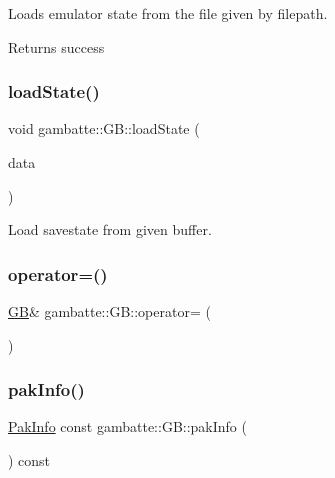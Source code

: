 Loads emulator state from the file given by \textquotesingle{}filepath\textquotesingle{}. \begin{DoxyReturn}{Returns}
success 
\end{DoxyReturn}
\mbox{\label{classgambatte_1_1GB_a8745c11c1ab010ac43147d537c35fb79}} 
\subsubsection{\texorpdfstring{load\+State()}{loadState()}\hspace{0.1cm}{\footnotesize\ttfamily [3/3]}}
{\footnotesize\ttfamily void gambatte\+::\+G\+B\+::load\+State (\begin{DoxyParamCaption}\item[{const std\+::vector$<$ char $>$ \&}]{data }\end{DoxyParamCaption})}

Load savestate from given buffer. \mbox{\label{classgambatte_1_1GB_a621e7cd52ce6278c5a521d024b995df5}} 
\subsubsection{\texorpdfstring{operator=()}{operator=()}}
{\footnotesize\ttfamily \hyperlink{classgambatte_1_1GB}{GB}\& gambatte\+::\+G\+B\+::operator= (\begin{DoxyParamCaption}\item[{\hyperlink{classgambatte_1_1GB}{GB} const \&}]{ }\end{DoxyParamCaption})\hspace{0.3cm}{\ttfamily [private]}}

\mbox{\label{classgambatte_1_1GB_a53f8602582e710cb1938ff6d1306bde9}} 
\subsubsection{\texorpdfstring{pak\+Info()}{pakInfo()}}
{\footnotesize\ttfamily \hyperlink{classgambatte_1_1PakInfo}{Pak\+Info} const gambatte\+::\+G\+B\+::pak\+Info (\begin{DoxyParamCaption}{ }\end{DoxyParamCaption}) const}

